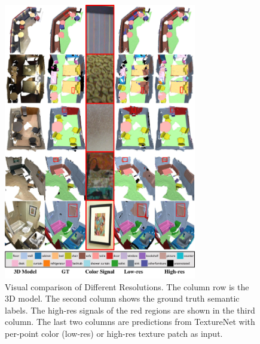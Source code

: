 \begin{figure}
    \centering
    \includegraphics[width=0.75\textwidth]{texturenet/supplemental/highres.pdf}
    \caption{Visual comparison of Different Resolutions. The column row is the 3D model. The second column shows the ground truth semantic labels. The high-res signals of the red regions are shown in the third column. The last two columns are predictions from TextureNet with per-point color (low-res) or high-res texture patch as input.}
    \label{fig:texturenet-highres}
\end{figure}

